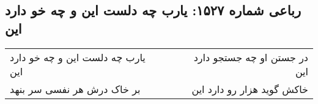 \begin{center}
\section*{رباعی شماره ۱۵۲۷: یارب چه دلست این و چه خو دارد این}
\label{sec:1527}
\begin{longtable}{l p{0.5cm} r}
یارب چه دلست این و چه خو دارد این
&&
در جستن او چه جستجو دارد این
\\
بر خاک درش هر نفسی سر بنهد
&&
خاکش گوید هزار رو دارد این
\\
\end{longtable}
\end{center}
